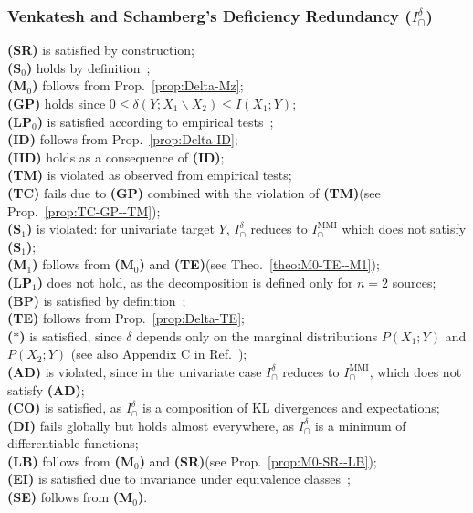 \documentclass{article}
\newcommand{\ts}[1]{\ensuremath{_{\text{#1}}}}
\newcommand{\SR}{\textbf{(SR)}\xspace} %
\newcommand{\Sz}{\textbf{(S\ts{0})}\xspace} %
\newcommand{\Mz}{\textbf{(M\ts{0})}\xspace} %
\newcommand{\GP}{\textbf{(GP)}\xspace} %
\newcommand{\LPz}{\textbf{(LP\ts{0})}\xspace} %
\newcommand{\ID}{\textbf{(ID)}\xspace} %
\newcommand{\IID}{\textbf{(IID)}\xspace} %
\newcommand{\TM}{\textbf{(TM)}\xspace} %
\newcommand{\TC}{\textbf{(TC)}\xspace} %
\newcommand{\So}{\textbf{(S\ts{1})}\xspace} %
\newcommand{\Mo}{\textbf{(M\ts{1})}\xspace} %
\newcommand{\LPo}{\textbf{(LP\ts{1})}\xspace} %
\newcommand{\BP}{\textbf{(BP)}\xspace} %
\newcommand{\TE}{\textbf{(TE)}\xspace} %
\newcommand{\AST}{\textbf{($\boldsymbol{\ast}$)}\xspace} %
\newcommand{\AD}{\textbf{(AD)}\xspace} %
\newcommand{\CO}{\textbf{(CO)}\xspace} %
\newcommand{\LB}{\textbf{(LB)}\xspace} %
\newcommand{\EI}{\textbf{(EI)}\xspace} %
\newcommand{\SE}{\textbf{(SE)}\xspace} %
\newcommand{\DI}{\textbf{(DI)}\xspace}
\newcommand{\IMMI}{\ensuremath{I_\cap^{\text{MMI}}}\xspace}
\newcommand{\Idelta}{\ensuremath{I_\cap^{\delta}}\xspace}
\begin{document}
\subsubsection*{Venkatesh and Schamberg's Deficiency Redundancy ($\Idelta$)}
    \SR is satisfied by construction; \\
    \Sz holds by definition~\cite{venkatesh2022partial}; \\
    \Mz follows from Prop.~\ref{prop:Delta-Mz}; \\
    \GP holds since $0\leq \delta(Y;X_1\backslash X_2)\leq I(X_1;Y)$; \\
    \LPz is satisfied according to empirical tests~\cite{venkatesh2022partial}; \\
    \ID follows from Prop.~\ref{prop:Delta-ID}; \\
    \IID holds as a consequence of \ID; \\
    \TM is violated as observed from empirical tests; \\
    \TC fails due to \GP combined with the violation of \TM (see Prop.~\ref{prop:TC-GP--TM}); \\
    \So is violated: for univariate target $Y$, \Idelta reduces to \IMMI which does not satisfy \So; \\
    \Mo follows from \Mz and \TE (see Theo.~\ref{theo:M0-TE--M1}); \\
    \LPo does not hold, as the decomposition is defined only for $n=2$ sources; \\
    \BP is satisfied by definition~\cite{venkatesh2022partial}; \\
    \TE follows from Prop.~\ref{prop:Delta-TE}; \\
    \AST is satisfied, since $\delta$ depends only on the marginal distributions $P(X_1;Y)$ and $P(X_2;Y)$ (see also Appendix C in Ref.~\cite{venkatesh2022partial}); \\
    \AD is violated, since in the univariate case \Idelta reduces to \IMMI, which does not satisfy \AD; \\
    \CO is satisfied, as \Idelta is a composition of KL divergences and expectations; \\
    \DI fails globally but holds almost everywhere, as \Idelta is a minimum of differentiable functions; \\  
    \LB follows from \Mz and \SR (see Prop.~\ref{prop:M0-SR--LB}); \\
    \EI is satisfied due to invariance under equivalence classes~\cite{li2011connection}; \\
    \SE follows from \Mz.
\end{document}
